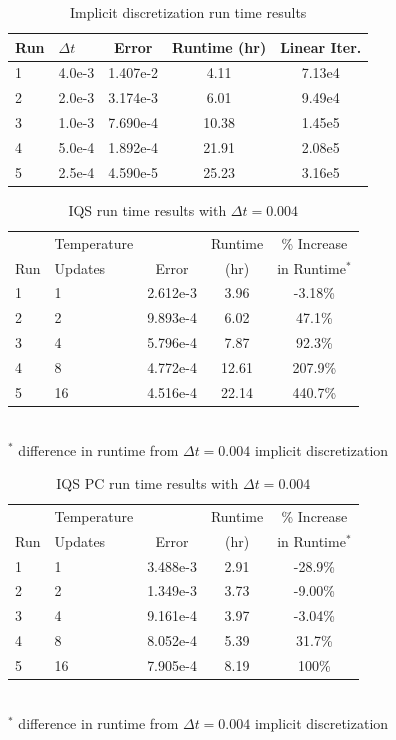 \documentclass{elsarticle}
\begin{document}
\begin{table}[!htbp]
\begin{center}
\caption{Implicit discretization run time results}
\label{tab:ndiff_lra}
\begin{tabular}{|l|l|ccc|}
\hline
Run  &  $\Delta t$ & Error & Runtime (hr) & Linear Iter.\\
\hline
1	& 4.0e-3	& 1.407e-2 	& 4.11	& 7.13e4	\\
2	& 2.0e-3	& 3.174e-3 	& 6.01	& 9.49e4 	\\
3 	& 1.0e-3 	& 7.690e-4 	& 10.38	& 1.45e5	\\
4 	& 5.0e-4 	& 1.892e-4 	& 21.91	& 2.08e5	\\
5 	& 2.5e-4	& 4.590e-5 	& 25.23	& 3.16e5	\\
\hline
\end{tabular}
\end{center}
\end{table}

\begin{table}[!htbp]
\begin{center}
\caption{IQS run time results with $\Delta t = 0.004$}
\label{tab:iqs_lra}
\begin{tabular}{|l|l|ccc|}
\hline
	&  Temperature 	&  		& Runtime 	& \% Increase	\\
Run	&  Updates 	& Error & (hr)		& in Runtime$^*$\\
\hline
1	& 1		& 2.612e-3 	& 3.96 	& -3.18\%	\\
2	& 2		& 9.893e-4 	& 6.02	&  47.1\%	\\
3 	& 4 	& 5.796e-4 	& 7.87	&  92.3\%	\\
4 	& 8 	& 4.772e-4 	& 12.61	& 207.9\% 	\\
5 	& 16	& 4.516e-4 	& 22.14	& 440.7\%	\\
\hline
\end{tabular}
\\
$^*$ difference in runtime from $\Delta t = 0.004$ implicit discretization 
\end{center}
\end{table}

\begin{table}[!htbp]
\begin{center}
\caption{IQS PC run time results with $\Delta t = 0.004$}
\label{tab:iqspc_lra}
\begin{tabular}{|l|l|ccc|}
\hline
	&  Temperature 	&  		& Runtime 	& \% Increase	\\
Run	&  Updates 	& Error & (hr)		& in Runtime$^*$\\
\hline
1	& 1		& 3.488e-3 	& 2.91 	& -28.9\%	\\
2	& 2		& 1.349e-3 	& 3.73	& -9.00\%	\\
3 	& 4 	& 9.161e-4 	& 3.97	& -3.04\%	\\
4 	& 8 	& 8.052e-4 	& 5.39	&  31.7\%	\\
5 	& 16	& 7.905e-4 	& 8.19	&  100\%	\\
\hline
\end{tabular}
\\
$^*$ difference in runtime from $\Delta t = 0.004$ implicit discretization 
\end{center}
\end{table}
\end{document}
